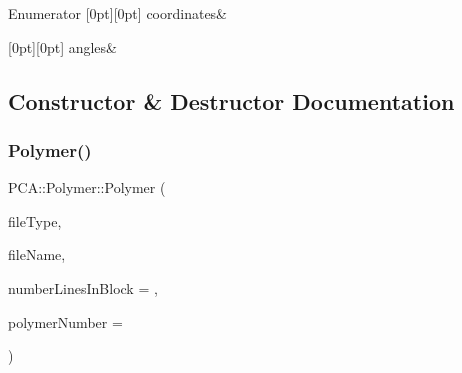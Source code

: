 \begin{DoxyEnumFields}{Enumerator}
[0pt][0pt]{}\hypertarget{class_p_c_a_1_1_polymer_a1df36a764fbf04ccd5cbe8edb49d43bda8387d77faaaa65484f5631d9f9d20bfc}{}\label{class_p_c_a_1_1_polymer_a1df36a764fbf04ccd5cbe8edb49d43bda8387d77faaaa65484f5631d9f9d20bfc} 
coordinates&\\
\hline

[0pt][0pt]{}\hypertarget{class_p_c_a_1_1_polymer_a1df36a764fbf04ccd5cbe8edb49d43bda9bd139e0f52be4a748903ff60b5d3985}{}\label{class_p_c_a_1_1_polymer_a1df36a764fbf04ccd5cbe8edb49d43bda9bd139e0f52be4a748903ff60b5d3985} 
angles&\\
\hline

\end{DoxyEnumFields}


\subsection{Constructor \& Destructor Documentation}
\hypertarget{class_p_c_a_1_1_polymer_ac835d908dc32b787ca80f26cd0e6c68b}{}\label{class_p_c_a_1_1_polymer_ac835d908dc32b787ca80f26cd0e6c68b} 
\subsubsection{\texorpdfstring{Polymer()}{Polymer()}\hspace{0.1cm}{\footnotesize\ttfamily [1/4]}}
{\footnotesize\ttfamily P\+C\+A\+::\+Polymer\+::\+Polymer (\begin{DoxyParamCaption}\item[{\hyperlink{class_p_c_a_1_1_polymer_a1df36a764fbf04ccd5cbe8edb49d43bd}{File\+Type}}]{file\+Type,  }\item[{char $\ast$}]{file\+Name,  }\item[{int}]{number\+Lines\+In\+Block = {},  }\item[{int}]{polymer\+Number = {} }\end{DoxyParamCaption})}



